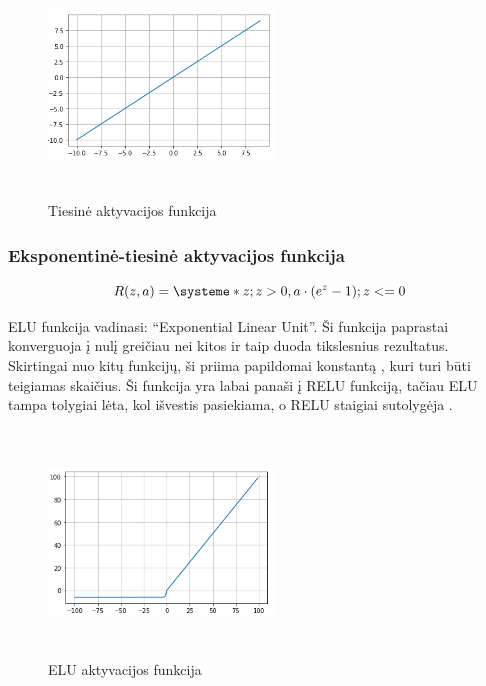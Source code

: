 \documentclass{VUMIFInfKursinis}
\begin{document}
\begin{figure}[ht]
  \centering
  \includegraphics[width=6cm,height=6cm,keepaspectratio]{tiesine.png}
  \caption{Tiesinė aktyvacijos funkcija}
  \label{fig:lygtis1}
\end{figure}

\subsubsection{Eksponentinė-tiesinė aktyvacijos funkcija}
\begin{equation}
  R(z, a) = \systeme*{z; z > 0, a \cdot (e^z - 1); z <= 0}
\end{equation}
\par
ELU funkcija vadinasi: \enquote{Exponential Linear Unit}. Ši funkcija paprastai konverguoja į
nulį greičiau nei kitos ir taip duoda tikslesnius rezultatus. Skirtingai nuo kitų
funkcijų, ši priima papildomai konstantą , kuri turi būti teigiamas skaičius.
Ši funkcija yra labai panaši į RELU funkciją, tačiau ELU tampa tolygiai lėta,
kol išvestis pasiekiama, o RELU staigiai sutolygėja \cite{salt16}.

\begin{figure}[ht]
  \centering
  \includegraphics[width=6cm,height=6cm,keepaspectratio]{elu.png}
  \caption{ELU aktyvacijos funkcija}
  \label{fig:elu}
\end{figure}
\end{document}
